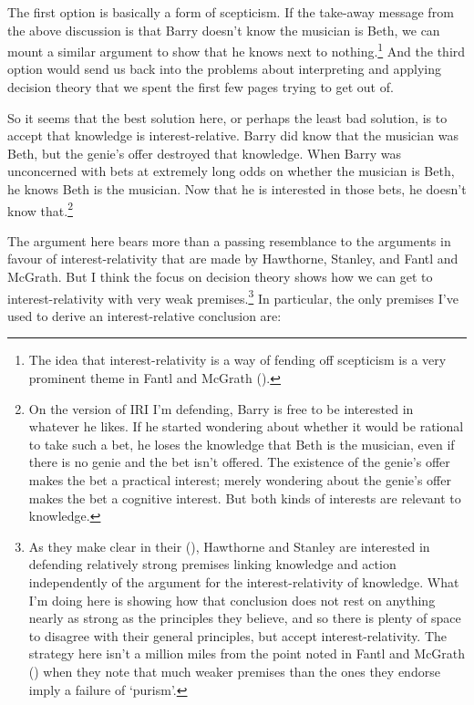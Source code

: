 \documentclass[
  10pt,
  letterpaper,
  DIV=11,
  numbers=noendperiod,
  twoside]{scrartcl}
\begin{document}
The first option is basically a form of scepticism. If the take-away
message from the above discussion is that Barry doesn't know the
musician is Beth, we can mount a similar argument to show that he knows
next to nothing.\footnote{The idea that interest-relativity is a way of
  fending off scepticism is a very prominent theme in Fantl and McGrath
  ().} And the third option would
send us back into the problems about interpreting and applying decision
theory that we spent the first few pages trying to get out of.

So it seems that the best solution here, or perhaps the least bad
solution, is to accept that knowledge is interest-relative. Barry did
know that the musician was Beth, but the genie's offer destroyed that
knowledge. When Barry was unconcerned with bets at extremely long odds
on whether the musician is Beth, he knows Beth is the musician. Now that
he is interested in those bets, he doesn't know that.\footnote{On the
  version of IRI I'm defending, Barry is free to be interested in
  whatever he likes. If he started wondering about whether it would be
  rational to take such a bet, he loses the knowledge that Beth is the
  musician, even if there is no genie and the bet isn't offered. The
  existence of the genie's offer makes the bet a practical interest;
  merely wondering about the genie's offer makes the bet a cognitive
  interest. But both kinds of interests are relevant to knowledge.}

The argument here bears more than a passing resemblance to the arguments
in favour of interest-relativity that are made by Hawthorne, Stanley,
and Fantl and McGrath. But I think the focus on decision theory shows
how we can get to interest-relativity with very weak
premises.\footnote{As they make clear in their
  (), Hawthorne and Stanley are
  interested in defending relatively strong premises linking knowledge
  and action independently of the argument for the interest-relativity
  of knowledge. What I'm doing here is showing how that conclusion does
  not rest on anything nearly as strong as the principles they believe,
  and so there is plenty of space to disagree with their general
  principles, but accept interest-relativity. The strategy here isn't a
  million miles from the point noted in Fantl and McGrath
  () when they note that
  much weaker premises than the ones they endorse imply a failure of
  `purism'.} In particular, the only premises I've used to derive an
interest-relative conclusion are:
\end{document}
